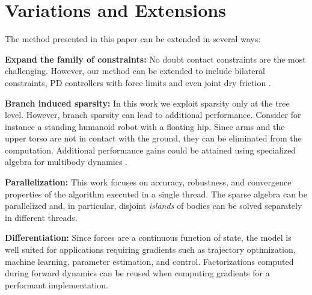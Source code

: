 \section{Variations and Extensions}
\label{sec:variations_and_extensions}

The method presented in this paper can be extended in several ways:

\textbf{Expand the family of constraints:} No doubt contact constraints are the
most challenging. However, our method can be extended to include bilateral
constraints, PD controllers with force limits and even joint dry friction
\cite{bib:todorov2014}.

\textbf{Branch induced sparsity:} In this work we exploit sparsity only at the
tree level. However, branch sparsity can lead to additional performance.
Consider for instance a standing humanoid robot with a floating hip. Since arms
and the upper torso are not in contact with the ground, they can be eliminated
from the computation. Additional performance gains could be attained using
specialized algebra for multibody dynamics \cite{bib:carpentier2021}.

\textbf{Parallelization:} This work focuses on accuracy, robustness, and
convergence properties of the algorithm executed in a single thread. The sparse
algebra can be parallelized and, in particular, disjoint \emph{islands} of
bodies can be solved separately in different threads.


\textbf{Differentiation:} Since forces are a continuous function of state, the
model is well suited for applications requiring gradients such as trajectory
optimization, machine learning, parameter estimation, and control.
Factorizations computed during forward dynamics can be reused when computing
gradients for a performant implementation.
